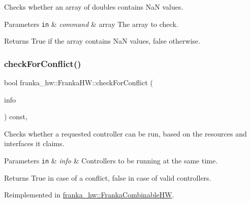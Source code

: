 Checks whether an array of doubles contains NaN values.


\begin{DoxyParams}[1]{Parameters}
\mbox{\tt in}  & {\em command} & array The array to check.\\
\hline
\end{DoxyParams}
\begin{DoxyReturn}{Returns}
True if the array contains NaN values, false otherwise. 
\end{DoxyReturn}
\mbox{\label{classfranka__hw_1_1_franka_h_w_a73e581982455acacca51d81e4676e9a6}} 
\subsubsection{\texorpdfstring{check\+For\+Conflict()}{checkForConflict()}}
{\footnotesize\ttfamily bool franka\+\_\+hw\+::\+Franka\+H\+W\+::check\+For\+Conflict (\begin{DoxyParamCaption}\item[{const std\+::list$<$ hardware\+\_\+interface\+::\+Controller\+Info $>$ \&}]{info }\end{DoxyParamCaption}) const\hspace{0.3cm}{\ttfamily [override]}, {\ttfamily [virtual]}}

Checks whether a requested controller can be run, based on the resources and interfaces it claims.


\begin{DoxyParams}[1]{Parameters}
\mbox{\tt in}  & {\em info} & Controllers to be running at the same time.\\
\hline
\end{DoxyParams}
\begin{DoxyReturn}{Returns}
True in case of a conflict, false in case of valid controllers. 
\end{DoxyReturn}


Reimplemented in \hyperlink{classfranka__hw_1_1_franka_combinable_h_w_aa2a84c1da5161ddb38e33f112c8850a7}{franka\+\_\+hw\+::\+Franka\+Combinable\+HW}.

\mbox{\label{classfranka__hw_1_1_franka_h_w_a120261c13cfa7f508061dd5c81d080e5}} 
